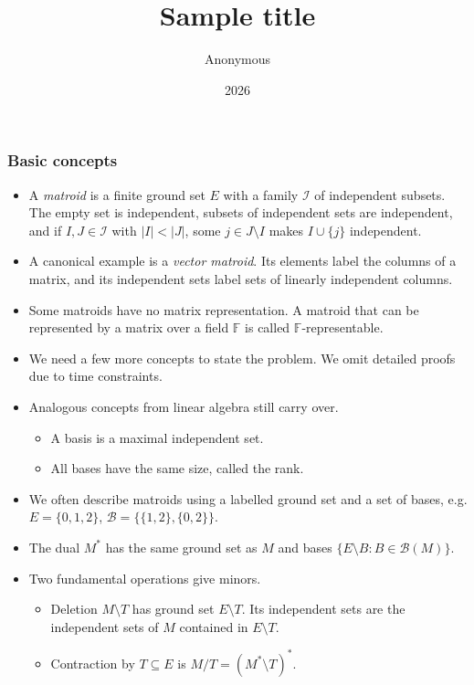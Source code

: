\documentclass{beamer}
\title{Sample title}
\author{Anonymous}
\date{2026}
\newcommand{\F}{\mathbb{F}}
\newcommand{\B}{\mathcal B}
\begin{document}
\frame{\titlepage}

\begin{frame}
\frametitle{Basic concepts}
\begin{itemize}
  \item A \emph{matroid} is a finite ground set $E$ with a family
    $\mathcal I$ of independent subsets. The empty set is independent,
    subsets of independent sets are independent, and if $I,J\in\mathcal I$
    with $|I|<|J|$, some $j\in J\setminus I$ makes $I\cup\{j\}$ independent.
  \item A canonical example is a \emph{vector matroid}. Its elements
    label the columns of a matrix, and its independent sets label
    sets of linearly independent columns.
  \item Some matroids have no matrix representation. A matroid that
    can be represented by a matrix over a field $\F$ is called
    $\F$-representable.
  \item We need a few more concepts to state the problem. We omit detailed
    proofs due to time constraints.
\end{itemize}
\end{frame}

\begin{frame}
  \begin{itemize}
    \item Analogous concepts from linear algebra still carry over.
      \begin{itemize}
        \item A basis is a maximal independent set.
        \item All bases have the same size, called the rank.
      \end{itemize}
    \item We often describe matroids using a labelled ground set and a set
      of bases, e.g. $E=\{0, 1, 2\}$, $\B = \{\{1, 2\}, \{0, 2\}\}$.
    \item The dual $M^*$ has the same ground set as $M$ and bases
      $\{E\setminus B:B\in\B(M)\}$.
    \item Two fundamental operations give minors.
      \begin{itemize}
        \item Deletion $M\setminus T$ has ground set $E\setminus T$.
          Its independent sets are the independent sets of $M$ contained
          in $E\setminus T$.
        \item Contraction by $T\subseteq E$ is $M/T = (M^*\setminus T)^*$.
      \end{itemize}
  \end{itemize}
\end{frame}
\end{document}
